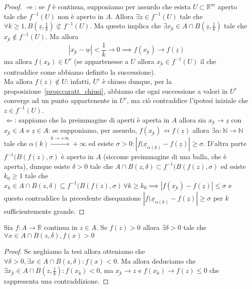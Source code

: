 \begin{proof} \hspace{1em} \newline
$\boxed{\Rightarrow}$: se $f$ è continua, supponiamo per assurdo che esista $U \subset \mathbb{R}^m$ aperto tale che $f^{-1}(U)$ non è aperto in $A$. Allora $\exists z \in f^{-1}(U)$ tale che $\forall k \geq 1, B(\underline{z}, \frac{1}{k}) \not\subset f^{-1}(U)$. Ma questo implica che $\exists \underline{x_k} \in A \cap B(\underline{z}, \frac{1}{k})$ tale che $\underline{x_k} \not\in f^{-1}(U)$. Ma allora 
$$
|\underline{x_k} - \underline{w}| < \frac{1}{k} \to 0 \implies f(\underline{x_k}) \to f(\underline{z})
$$
ma allora $f(x_k) \in U^c$ (se appartenesse a $U$ allora $\underline{x_k} \in f^{-1}(U)$ il che contraddice come abbiamo definito la successione). \\ Ma allora $f(z) \not\in U$: infatti, $U^c$ è chiuso dunque, per la proposizione~\ref{prop:caratt_chiusi}, abbiamo che ogni successione a valori in $U^c$ converge ad un punto appartenente in $U^c$, ma ciò contraddice l'ipotesi iniziale che $z \in f^{-1}(U)$. \\
$\boxed{\Leftarrow}$: sappiamo che la preimmagine di aperti è aperta in $A$ allora sia $\underline{x_k} \to \underline{z}$ con $\underline{x_k} \in A$ e $\underline{z} \in A$: se supponiamo, per assurdo, $f(\underline{x_k}) \not\to f(\underline{z})$ allora $\exists \alpha: \mathbb{N} \to \mathbb{N}$ tale che $\alpha(k) \stackrel{k \to +\infty}{\to} +\infty$ ed esiste $\sigma > 0: |f(\underline{x}_{\alpha(k)} - f(\underline{z})| \geq \sigma$. D'altra parte $f^{-1}(B(f(z), \sigma)$ è aperto in $A$ (siccome preimmagine di una balla, che è aperta), dunque esiste $\delta > 0$ tale che $A \cap B(z, \delta) \subset f^{-1}(B(f(z), \sigma)$ ed esiste $k_0 \geq 1$ tale che $x_k \in A \cap B(z, \delta) \subseteq f^{-1}(B(f(z), \sigma) \, \forall k \geq k_0 \implies |f(\underline{x_k}) - f(\underline{z})| \leq \sigma$ e questo contraddice la precedente disequazione $|f(\underline{x}_{\alpha(k)}-f(\underline{z})| \geq \sigma$ per $k$ sufficientemente grande.
\end{proof}
\begin{theorem}
Sia $f: A \to \mathbb{R}$ continua in $z \in A$. Se $f(z) > 0$ allora $\exists \delta > 0$ tale che $\forall x \in A \cap B(z, \delta), f(x) > 0$
\end{theorem}
\begin{proof}
Se neghiamo la tesi allora otteniamo che $\forall \delta > 0, \exists x \in A \cap B(z, \delta): f(x) < 0$. Ma allora deduciamo che $\exists \underline{x_k} \in A \cap B(z, \frac{1}{k}): f(x_k) <0$, ma $\underline{x_k} \to z$ e $f(x_k) \to f(z) \leq 0$ che rappresenta una contraddizione.
\end{proof}
